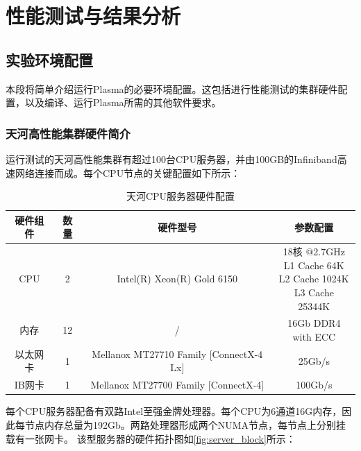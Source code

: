 \chapter{性能测试与结果分析}

\section{实验环境配置}

本段将简单介绍运行Plasma的必要环境配置。这包括进行性能测试的集群硬件配置，以及编译、运行Plasma所需的其他软件要求。

\subsection{天河高性能集群硬件简介}

运行测试的天河高性能集群有超过100台CPU服务器，并由100GB的Infiniband高速网络连接而成。每个CPU节点的关键配置如下所示：

\begin{table}[h]
    \centering
    \caption{天河CPU服务器硬件配置}
    \begin{tabular}{*{4}{c}}
        \toprule
        硬件组件  & 数量 & 硬件型号 & 参数配置 \\
        \midrule
        CPU  	 & 2  & Intel(R) Xeon(R) Gold 6150 & \makecell{18核 @2.7GHz \\ L1 Cache 64K \\ L2 Cache 1024K \\ L3 Cache 25344K} \\
        \midrule
        内存 	 & 12 & / & \makecell{16Gb DDR4 \\ with ECC} \\
        \midrule
    	以太网卡 & 1  & Mellanox MT27710 Family [ConnectX-4 Lx]   & 25Gb/s \\
    	IB网卡   & 1  & Mellanox MT27700 Family [ConnectX-4] & 100Gb/s \\
        \bottomrule
    \end{tabular}
    \label{tab:hardware_config}
\end{table}

每个CPU服务器配备有双路Intel至强金牌处理器。每个CPU为6通道16G内存，因此每节点内存总量为192Gb。两路处理器形成两个NUMA节点，每节点上分别挂载有一张网卡。
该型服务器的硬件拓扑图如\autoref{fig:server_block}所示：


